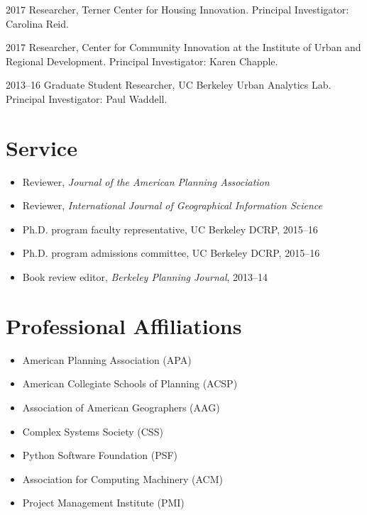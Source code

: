 \documentclass{academiccv}
\begin{document}
\begin{tablist}
\item[2017] 	\tab Researcher, Terner Center for Housing Innovation. Principal Investigator: Carolina Reid.
\item[2017] 	\tab Researcher, Center for Community Innovation at the Institute of Urban and Regional Development. Principal Investigator: Karen Chapple.
\item[2013--16] \tab Graduate Student Researcher, UC Berkeley Urban Analytics Lab. Principal Investigator: Paul Waddell.
\end{tablist}



\section*{Service}

\begin{itemize}
\item Reviewer, \emph{Journal of the American Planning Association}
\item Reviewer, \emph{International Journal of Geographical Information Science}
\item Ph.D. program faculty representative, UC Berkeley DCRP, 2015--16
\item Ph.D. program admissions committee, UC Berkeley DCRP, 2015--16
\item Book review editor, \emph{Berkeley Planning Journal}, 2013--14
\end{itemize}



\section*{Professional Affiliations}

\begin{itemize}
\item American Planning Association (APA)
\item American Collegiate Schools of Planning (ACSP)
\item Association of American Geographers (AAG)
\item Complex Systems Society (CSS)
\item Python Software Foundation (PSF)
\item Association for Computing Machinery (ACM)
\item Project Management Institute (PMI)
\end{itemize}
\end{document}
